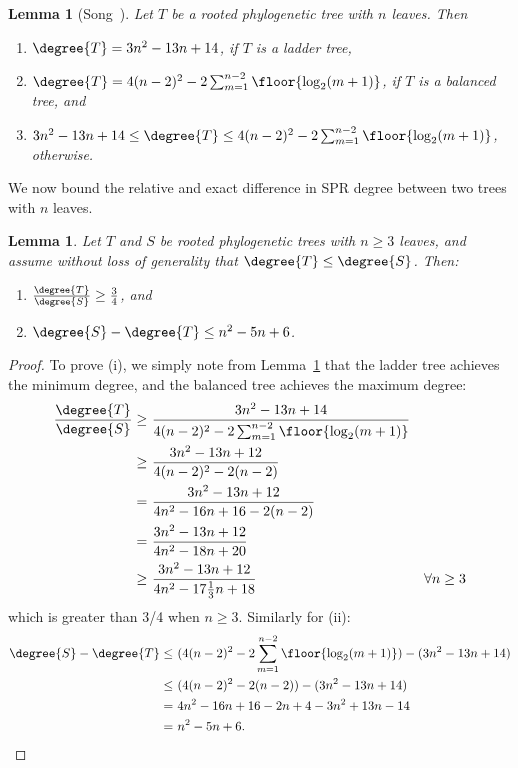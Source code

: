 \documentclass[11pt,onecolumn,conference]{IEEEtran}
\newtheorem{lemma}[theorem]{Lemma}
\newcommand{\cuttable}[1]{#1} %
\begin{document}
\begin{lemma}[{Song~\cite{Song2003-gf}}]
    \pushQED{\qed}
	\label{lem:degree_extremes}
	Let $T$ be a rooted phylogenetic tree with $n$ leaves. Then
	\begin{enumerate}
		\item $\degree{T} = 3n^2 - 13n + 14$, if $T$ is a ladder tree,
		\item $\degree{T} = 4(n-2)^2 - 2 \sum_{m=1}^{n-2} \floor{\log_2(m+1)}$, if $T$ is a balanced tree, and
		\item  $3n^2 - 13n + 14 \le \degree{T} \le 4(n-2)^2 - 2 \sum_{m=1}^{n-2} \floor{\log_2(m+1)}$, otherwise.
	\end{enumerate}
    \popQED
\end{lemma}

We now bound the relative and exact difference in SPR degree between two trees with $n$ leaves.

\begin{lemma}
	\label{lem:degree_max_delta}
	Let $T$ and $S$ be rooted phylogenetic trees with $n \ge 3$ leaves, and assume without loss of generality that $\degree{T} \le \degree{S}$.
	Then:
	\begin{enumerate}
		\item $\frac{\degree{T}}{\degree{S}} \ge \frac{3}{4}$, and
		\item $\degree{S} - \degree{T} \le n^2 - 5n + 6$.
	\end{enumerate}
\end{lemma}
\begin{proof}
	To prove (i), we simply note from Lemma~\ref{lem:degree_extremes} that the ladder tree achieves the minimum degree, and the balanced tree achieves the maximum degree:
	\begin{align*}
		\frac{\degree{T}}{\degree{S}} \ge\ &\frac{3n^2 - 13n + 14}{4(n-2)^2 - 2 \sum_{m=1}^{n-2} \floor{\log_2(m+1)}} \\
		\ge\ &\frac{3n^2 - 13n + 12}{4(n-2)^2 - 2(n-2)} \\
		\cuttable{= \ &\frac{3n^2 - 13n + 12}{4n^2 - 16n + 16 - 2(n-2)} \\}
		= \ &\frac{3n^2 - 13n + 12}{4n^2 - 18n + 20} \\
		\cuttable{\ge\ &\frac{3n^2 - 13n + 12}{4n^2 - 17\frac{1}{3}n + 18} &\forall n \ge 3 \\}
	\end{align*}
	which is greater than 3/4 when $n \ge 3$.
    Similarly for (ii):
	\begin{align*}
		\cuttable{\degree{S} - \degree{T}
		\le\ &(4(n-2)^2 - 2 \sum_{m=1}^{n-2} \floor{\log_2(m+1)})
		- (3n^2 - 13n + 14) \\}
		\le\ &(4(n-2)^2 - 2(n-2)) - (3n^2 - 13n + 14) \\
		\cuttable{=\ &4n^2 - 16n + 16 - 2n +4 - 3n^2 + 13n - 14 \\}
		=\ &n^2 - 5n + 6.
	\end{align*}
\end{proof}
\end{document}
